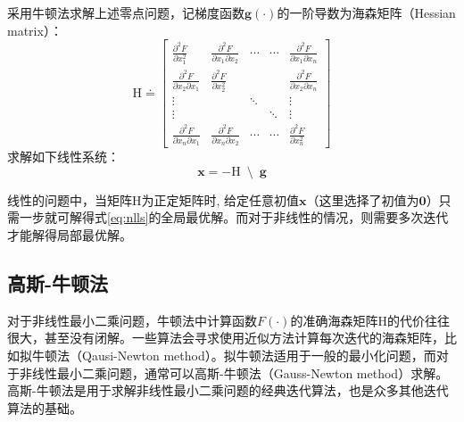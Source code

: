 采用牛顿法求解上述零点问题，记梯度函数$\bm{g}(\cdot)$的一阶导数为海森矩阵（Hessian matrix）：
\begin{equation}
    \mathrm{H} \doteq \begin{bmatrix}
        \frac{\partial^2 F}{\partial x_1^2} &
        \frac{\partial^2 F}{\partial x_1 \partial x_2} &
        \cdots & \cdots &
        \frac{\partial^2 F}{\partial x_1 \partial x_n} \\
        \frac{\partial^2 F}{\partial x_2 \partial x_1} &
        \frac{\partial^2 F}{\partial x_2^2} &
        & &
        \frac{\partial^2 F}{\partial x_2 \partial x_n} \\
        \vdots & & \ddots & & \vdots \\
        \vdots & & & \ddots & \vdots \\
        \frac{\partial^2 F}{\partial x_n \partial x_1} &
        \frac{\partial^2 F}{\partial x_n \partial x_2} &
        \cdots & \cdots &
        \frac{\partial^2 F}{\partial x_n^2}
    \end{bmatrix}
\end{equation}
求解如下线性系统：
\begin{equation}
    \bm{x} = -\mathrm{H} \enspace\setminus\enspace \bm{g}
    \label{eq:linsys}
\end{equation}

线性的问题中，当矩阵$\mathrm{H}$为正定矩阵时, 给定任意初值$\bm{x}$（这里选择了初值为$\bm{0}$）只需一步就可解得式\eqref{eq:nlls}的全局最优解。而对于非线性的情况，则需要多次迭代才能解得局部最优解。

\subsection{高斯-牛顿法}\label{sec:gn}

对于非线性最小二乘问题，牛顿法中计算函数$F(\cdot)$的准确海森矩阵$\mathrm{H}$的代价往往很大，甚至没有闭解。一些算法会寻求使用近似方法计算每次迭代的海森矩阵，比如拟牛顿法\citep{tingleff2004methods}（Qausi-Newton method）。拟牛顿法适用于一般的最小化问题，而对于非线性最小二乘问题，通常可以高斯-牛顿法（Gauss-Newton method）求解。高斯-牛顿法是用于求解非线性最小二乘问题的经典迭代算法，也是众多其他迭代算法的基础。

